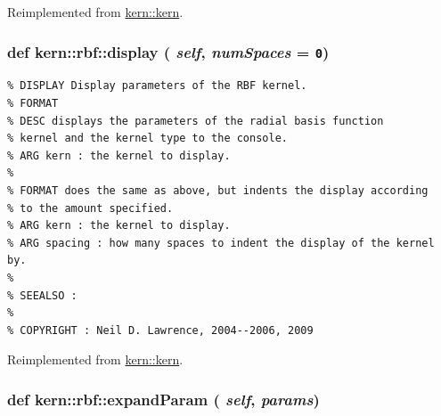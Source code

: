 Reimplemented from \hyperlink{classkern_1_1kern}{kern::kern}.\hypertarget{classkern_1_1rbf_20fdea38a18a1f81907c5a7d11d0eb22}{
\subsubsection[{display}]{\setlength{\rightskip}{0pt plus 5cm}def kern::rbf::display ( {\em self}, \/   {\em numSpaces} = {\tt 0})}}
\label{classkern_1_1rbf_20fdea38a18a1f81907c5a7d11d0eb22}




\footnotesize\begin{verbatim}% DISPLAY Display parameters of the RBF kernel.
% FORMAT
% DESC displays the parameters of the radial basis function
% kernel and the kernel type to the console.
% ARG kern : the kernel to display.
%
% FORMAT does the same as above, but indents the display according
% to the amount specified.
% ARG kern : the kernel to display.
% ARG spacing : how many spaces to indent the display of the kernel by.
%
% SEEALSO :
%
% COPYRIGHT : Neil D. Lawrence, 2004--2006, 2009

\end{verbatim}
\normalsize
 

Reimplemented from \hyperlink{classkern_1_1kern}{kern::kern}.\hypertarget{classkern_1_1rbf_c514b52ff98203ead791b7f7a9c35469}{
\subsubsection[{expandParam}]{\setlength{\rightskip}{0pt plus 5cm}def kern::rbf::expandParam ( {\em self}, \/   {\em params})}}
\label{classkern_1_1rbf_c514b52ff98203ead791b7f7a9c35469}




